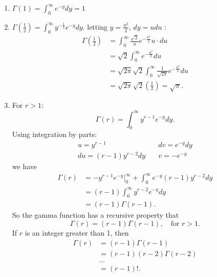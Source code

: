 \begin{property}
\begin{enumerate}
	\item $\Gamma \left( 1 \right)  = \int_{0}^{\infty} e ^{-y} dy = 1 $ 
	\item $\Gamma \left( \frac{1}{2} \right)  = \int_{0}^{\infty} y ^{ -\frac{1}{2}}e ^{ -y } dy$. letting $y = \frac{u ^2 }{2}$, $dy = u du$ :
		\begin{align*}
			\Gamma\left( \frac{1}{2} \right) &=  \int_{0}^{\infty} \frac{\sqrt{2} }{u}e ^{-\frac{u ^2}{2}} u \cdot du  \\
			&= \sqrt{2} \int_{0}^{\infty} e ^{- \frac{u ^2 }{2}} du \\
			&= \sqrt{2 \pi} \sqrt{2} \int_{0}^{\infty} \frac{1}{\sqrt{2 \pi} }e ^{- \frac{u ^2 }{2}} du  \\
			&= \sqrt{2 \pi } \sqrt{2} \left( \frac{1}{2} \right) = \sqrt{\pi} 
		.\end{align*}
	\item For $r > 1$:
		\[
			\Gamma\left( r \right) = \int_{0}^{\infty} y ^{r - 1}e ^{ -y}dy 
		.\] 
		Using integration by parts:
		\begin{align*}
			u = y ^{r - 1} &\quad dv = e ^{-y }dy \\
			du = \left( r - 1 \right) y ^{r - 2 }dy  & \quad v = -e ^{-y}
		\end{align*}
		we have 
		\begin{align*}
			\Gamma \left( r  \right) &= -y ^{r - 1}e ^{ -y} | ^{\infty}_{0} + \int_{0}^{\infty} e ^{ -y}\left( r - 1 \right) y ^{ r - 2}dy  \\
						 &= \left( r - 1 \right) \int_{0}^{\infty} y ^{r - 2}e ^{ -y}dy  \\
						 &= \left( r - 1 \right) \Gamma\left( r - 1 \right)
		.\end{align*}
		So the gamma function has a recursive property that 
		\[
			\Gamma\left( r  \right) = \left( r - 1 \right) \Gamma \left( r - 1 \right) , \quad \text{for }r > 1
		.\] 
		If $r$ is an integer greater than 1, then 
		\begin{align*}
			\Gamma \left( r  \right) &= \left( r - 1 \right) \Gamma \left( r - 1 \right)  \\
						 &= \left( r - 1 \right) \left( r - 2 \right) \Gamma\left( r - 2 \right)  \\
						 &\ldots\\
						 &= \left( r - 1 \right) !
		.\end{align*}
\end{enumerate}
\end{property}

